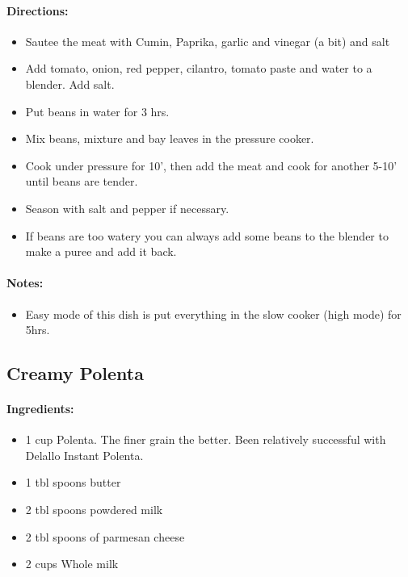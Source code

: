 \documentclass{article}
\begin{document}
\paragraph{Directions:}
\begin{itemize}
    \item Sautee the meat with Cumin, Paprika, garlic and vinegar (a bit) and salt
    \item Add tomato, onion, red pepper, cilantro, tomato paste and water to a blender. Add salt.
    \item Put beans in water for 3 hrs.
    \item Mix beans, mixture and bay leaves in the pressure cooker.
    \item Cook under pressure for 10', then add the meat and cook for another 5-10' until beans are tender.
    \item Season with salt and pepper if necessary.
    \item If beans are too watery you can always add some beans to the blender to make a puree and add it back.
\end{itemize}

\paragraph{Notes:}
\begin{itemize}
    \item Easy mode of this dish is put everything in the slow cooker (high mode) for 5hrs.
\end{itemize}

\subsection{Creamy Polenta}

\paragraph{Ingredients:}
\begin{itemize}
    \item 1 cup Polenta. The finer grain the better. Been relatively successful with Delallo Instant Polenta.
    \item 1 tbl spoons butter
    \item 2 tbl spoons powdered milk
    \item 2 tbl spoons of parmesan cheese
    \item 2 cups Whole milk
\end{itemize}
\end{document}
